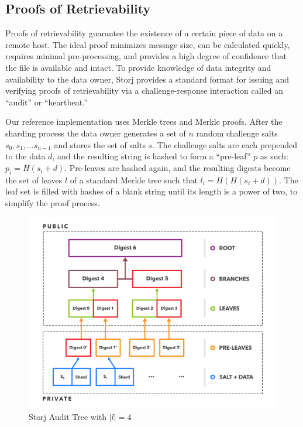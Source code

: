 \documentclass[a4paper,10pt]{article}
\begin{document}
\subsection{Proofs of Retrievability}
Proofs of retrievability guarantee the existence of a certain piece of data on a remote host. The ideal proof minimizes message size, can be calculated quickly, requires minimal pre-processing, and provides a high degree of confidence that the file is available and intact. To provide knowledge of data integrity and availability to the data owner, Storj provides a standard format for issuing and verifying proofs of retrievability via a challenge-response interaction called an “audit” or “heartbeat.”

Our reference implementation uses Merkle trees \cite{5} and Merkle proofs. After the sharding process the data owner generates a set of $ n $ random challenge salts $ s_{0}, s_{1}, ... s_{n-1} $ and stores the set of salts $ s $. The challenge salts are each prepended to the data $ d $, and the resulting string is hashed to form a “pre-leaf” $ p $ as such: $ p_{i} = H(s_{i} + d) $. Pre-leaves are hashed again, and the resulting digests become the set of leaves $ l $ of a standard Merkle tree such that $ l_{i} = H(H(s_{i} + d)) $. The leaf set is filled with hashes of a blank string until its length is a power of two, to simplify the proof process.

\begin{figure}[hbt]
\centering
\includegraphics[width=\linewidth]{2}
\caption{Storj Audit Tree with $ |l| = 4 $}
\end{figure}
\end{document}
